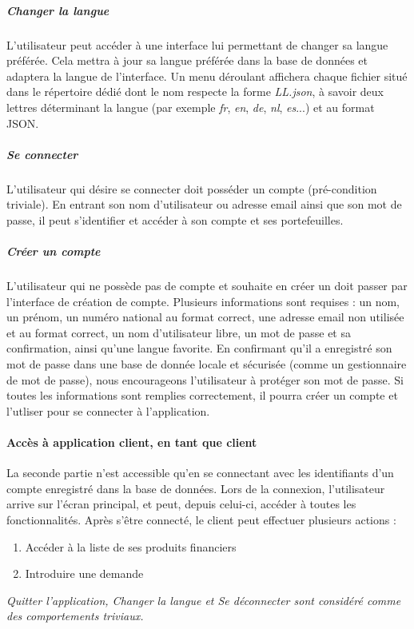 \subparagraph{Changer la langue}
L'utilisateur peut accéder à une interface lui permettant de changer sa langue préférée. Cela mettra à jour sa langue préférée dans la base de données et adaptera la langue de l'interface. Un menu déroulant affichera chaque fichier situé dans le répertoire dédié dont le nom respecte la forme \emph{LL.json}, à savoir deux lettres déterminant la langue (par exemple \emph{fr}, \emph{en}, \emph{de}, \emph{nl}, \emph{es}...) et au format JSON.


\subparagraph{Se connecter}
L'utilisateur qui désire se connecter doit posséder un compte (pré-condition triviale). En entrant son nom d'utilisateur ou adresse email ainsi que son mot de passe, il peut s'identifier et accéder à son compte et ses portefeuilles.


\subparagraph{Créer un compte}
L'utilisateur qui ne possède pas de compte et souhaite en créer un doit passer par l'interface de création de compte. Plusieurs informations sont requises : un nom, un prénom, un numéro national au format correct, une adresse email non utilisée et au format correct, un nom d'utilisateur libre, un mot de passe et sa confirmation, ainsi qu'une langue favorite. En confirmant qu'il a enregistré son mot de passe dans une base de donnée locale et sécurisée (comme un gestionnaire de mot de passe), nous encourageons l'utilisateur à protéger son mot de passe. Si toutes les informations sont remplies correctement, il pourra créer un compte et l'utliser pour se connecter à l'application.


\paragraph{Accès à application client, en tant que client} La seconde partie n'est accessible qu'en se connectant avec les identifiants d'un compte enregistré dans la base de données. Lors de la connexion, l'utilisateur arrive sur l'écran principal, et peut, depuis celui-ci, accéder à toutes les fonctionnalités. Après s'être connecté, le client peut effectuer plusieurs actions :
\begin{enumerate}
\item Accéder à la liste de ses produits financiers
\item Introduire une demande
\end{enumerate}
\begin{scriptsize}
\textit{\emph{Quitter l'application}, \emph{Changer la langue} et \emph{Se déconnecter} sont considéré comme des comportements triviaux.}
\end{scriptsize}


